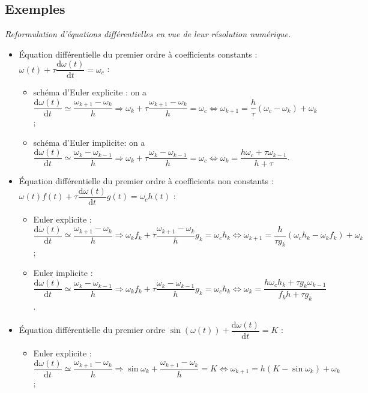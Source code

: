 \subsection{Exemples}
\textit{Reformulation d'équations différentielles en vue de leur résolution numérique.}
\begin{itemize}[label=,font=\color{ocre}] 
\item Équation différentielle du premier ordre à coefficients constants : $\omega(t) + \tau \dfrac{\text{d} \omega(t)}{\text{d}t} = \omega_c $ :
\begin{itemize}
\item schéma d'Euler explicite : on a $\dfrac{\text{d} \omega(t)}{\text{d}t}\simeq \dfrac{\omega_{k+1}-\omega_k}{h} \Rightarrow  \omega_k + \tau  \dfrac{\omega_{k+1}-\omega_k}{h} = \omega_c  \Leftrightarrow \omega_{k+1} =\dfrac{h}{\tau} \left(\omega_c - \omega_k\right)+\omega_k$;
\item schéma d'Euler implicite: on a $\dfrac{\text{d} \omega(t)}{\text{d}t}\simeq \dfrac{\omega_{k}-\omega_{k-1}}{h} \Rightarrow  \omega_k + \tau  \dfrac{\omega_{k}-\omega_{k-1}}{h} = \omega_c  \Leftrightarrow   \omega_k = \dfrac{h\omega_c + \tau\omega_{k-1}}{h+\tau} $.
\end{itemize}
\item Équation différentielle du premier ordre à coefficients non constants :  $\omega(t) f(t) + \tau \dfrac{\text{d} \omega(t)}{\text{d}t} g(t)  = \omega_c h(t)$ :
\begin{itemize}
\item Euler explicite : $\dfrac{\text{d} \omega(t)}{\text{d}t}\simeq \dfrac{\omega_{k+1}-\omega_k}{h} \Rightarrow  \omega_k f_k+ \tau  \dfrac{\omega_{k+1}-\omega_k}{h} g_k= \omega_c h_k  \Leftrightarrow \omega_{k+1} =\dfrac{h}{\tau g_k} \left(\omega_c h_k - \omega_k f_k \right)+\omega_k$;
\item Euler implicite : $\dfrac{\text{d} \omega(t)}{\text{d}t}\simeq \dfrac{\omega_{k}-\omega_{k-1}}{h} \Rightarrow  \omega_k f_k+ \tau \dfrac{\omega_{k}-\omega_{k-1}}{h} g_k= \omega_c h_k  \Leftrightarrow \omega_k =  \dfrac{h\omega_c h_k +\tau g_k\omega_{k-1}}{f_k h+   \tau g_k}  $.
\end{itemize}
\item Équation différentielle du premier ordre  $\sin \left(\omega(t)\right) + \dfrac{\text{d}\omega(t)}{\text{d}t}=K$ :
\begin{itemize}
\item Euler explicite : $\dfrac{\text{d} \omega(t)}{\text{d}t}\simeq \dfrac{\omega_{k+1}-\omega_k}{h} \Rightarrow  \sin \omega_k +  \dfrac{\omega_{k+1}-\omega_k}{h}=K \Leftrightarrow  \omega_{k+1}=h\left( K - \sin \omega_k\right)+\omega_k$;

\end{itemize}
\end{itemize}

